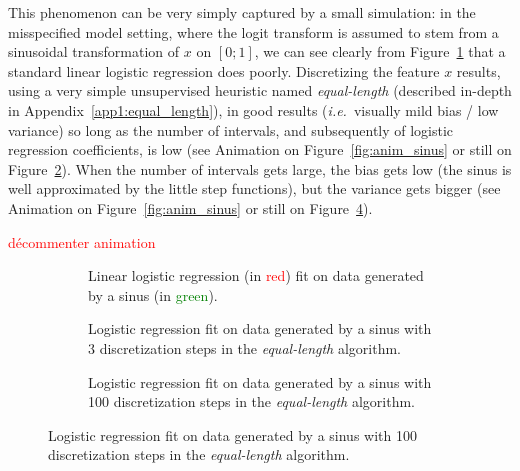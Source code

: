 This phenomenon can be very simply captured by a small simulation: in the misspecified model setting, where the logit transform is assumed to stem from a sinusoidal transformation of $x$ on $[0;1]$, we can see clearly from Figure~\ref{fig:sinus_lin} that a standard linear logistic regression does poorly. Discretizing the feature $x$ results, using a very simple unsupervised heuristic named \textit{equal-length} (described in-depth in Appendix~\ref{app1:equal_length}), in good results (\textit{i.e.}\ visually mild bias / low variance) so long as the number of intervals, and subsequently of logistic regression coefficients, is low (see Animation on Figure~\ref{fig:anim_sinus} or still on Figure~\ref{fig:sinus_deb}). When the number of intervals gets large, the bias gets low (the sinus is well approximated by the little step functions), but the variance gets bigger (see Animation on Figure~\ref{fig:anim_sinus} or still on Figure~\ref{fig:sinus_fin}).


\textcolor{red}{décommenter animation}

\begin{figure}[!h]
\begin{subfigure}[t]{\textwidth}
\resizebox{\textwidth}{7cm}{}
\caption{\label{fig:sinus_lin} Linear logistic regression (in \textcolor{red}{red}) fit on data generated by a sinus (in \textcolor{green}{green}).}
\end{subfigure}
\begin{subfigure}[t]{\textwidth}
\resizebox{\textwidth}{7cm}{}
\caption{\label{fig:sinus_deb} Logistic regression fit on data generated by a sinus with 3 discretization steps in the \textit{equal-length} algorithm.}
\end{subfigure}
\begin{subfigure}[t]{\textwidth}
\resizebox{\textwidth}{7cm}{}
\caption{\label{fig:sinus_fin} Logistic regression fit on data generated by a sinus with 100 discretization steps in the \textit{equal-length} algorithm.}
\end{subfigure}
\end{figure}
 
